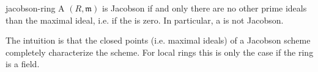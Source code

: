 \begin{example}{jacobson-ring}
    A  $(R, \mathfrak{m})$ is Jacobson if and only there are no other prime ideals than the maximal ideal, i.e. if the  is zero. In particular, a  is not Jacobson.
    
    The intuition is that the closed points (i.e. maximal ideals) of a Jacobson scheme completely characterize the scheme. For local rings this is only the case if the ring is a field.
\end{example}